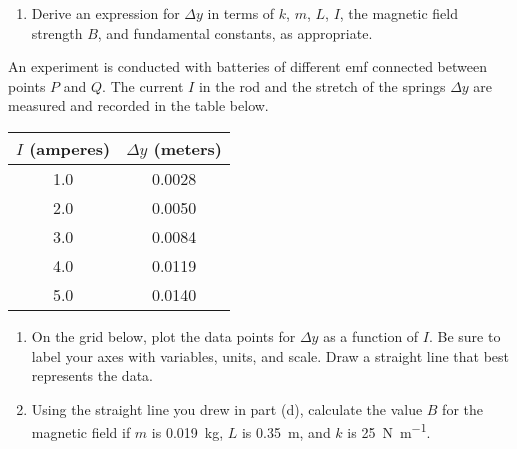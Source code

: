 \documentclass{../../../oss-classkick}
\begin{document}
\begin{enumerate}[leftmargin=15pt]
\begin{enumerate}
  \item Derive an expression for $\Delta y$ in terms of $k$, $m$, $L$, $I$, the
    magnetic field strength $B$, and fundamental constants, as appropriate.
  \end{enumerate}
  \newpage
  An experiment is conducted with batteries of different emf connected between
  points $P$ and $Q$. The current $I$ in the rod and the stretch of the springs
  $\Delta y$ are measured and recorded in the table below.
  \begin{center}
    \begin{tabular}{|c|c|}
      \hline
      $I$ (amperes) & $\Delta y$ (meters)\\\hline
      1.0 & 0.0028\\\hline
      2.0 & 0.0050\\\hline
      3.0 & 0.0084\\\hline
      4.0 & 0.0119\\\hline
      5.0 & 0.0140\\\hline
    \end{tabular}
  \end{center}
  \begin{enumerate}[resume]
  \item On the grid below, plot the data points for $\Delta y$ as a function of
    $I$. Be sure to label your axes with variables, units, and scale. Draw a
    straight line that best represents the data.
    
    \vspace{.2in}
    \begin{center}
    \end{center}
    \vspace{.3in}
    
  \item Using the straight line you drew in part (d), calculate the value $B$
    for the magnetic field if $m$ is \SI{.019}{\kilo\gram}, $L$ is
    \SI{.35}{\metre}, and $k$ is \SI{25}{\newton\per\metre}.
  \end{enumerate}
\end{enumerate}
\end{document}
